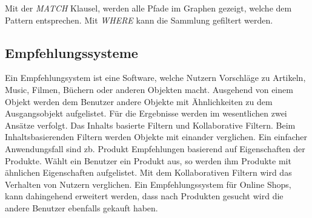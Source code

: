 Mit der \textit{MATCH} Klausel, werden alle Pfade im Graphen gezeigt, welche dem Pattern entsprechen. Mit \textit{WHERE} kann die Sammlung gefiltert werden.

\subsection{Empfehlungssysteme}

Ein Empfehlungsystem ist eine Software, welche Nutzern Vorschläge zu Artikeln, Music, Filmen, Büchern oder anderen Objekten macht. \cite{Ricci2010} Ausgehend von einem Objekt werden dem Benutzer andere Objekte mit Ähnlichkeiten zu dem Ausgangsobjekt aufgelistet. Für die Ergebnisse werden im wesentlichen zwei Ansätze verfolgt. Das Inhalts basierte Filtern und Kollaborative Filtern. 
Beim Inhaltsbasierenden Filtern werden Objekte mit einander verglichen. Ein einfacher Anwendungsfall sind zb. Produkt Empfehlungen basierend auf Eigenschaften der Produkte. Wählt ein Benutzer ein Produkt aus, so werden ihm Produkte mit ähnlichen Eigenschaften aufgelistet. 
Mit dem Kollaborativen Filtern wird das Verhalten von Nutzern verglichen. Ein Empfehlungssystem für Online Shops, kann dahingehend erweitert werden, dass nach Produkten gesucht wird die andere Benutzer ebenfalls gekauft haben. 

	